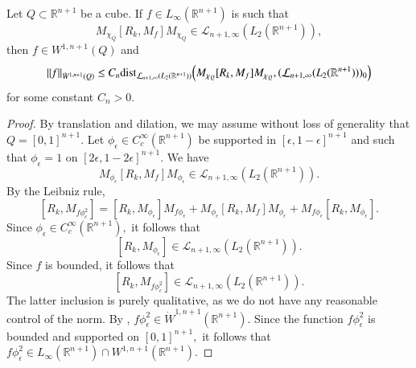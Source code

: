 \documentclass[12pt]{amsart}
\begin{document}
\begin{lemma}\label{second distance lemma} Let $Q\subset\mathbb{R}^{n+1}$ be a cube. If $f\in L_{\infty}(\mathbb{R}^{n+1})$ is such that
$$M_{\chi_Q}[R_k,M_f]M_{\chi_Q}\in\mathcal{L}_{n+1,\infty}(L_2(\mathbb{R}^{n+1})),$$
then $f\in W^{1,n+1}(Q)$ and
$$\|f\|_{\dot{W}^{1,n+1}(Q)}\leq C_n{\rm dist}_{\mathcal{L}_{n+1,\infty}(L_2(\mathbb{R}^{n+1}))}\Big(M_{\chi_Q}[R_k,M_f]M_{\chi_Q},(\mathcal{L}_{n+1,\infty}(L_2(\mathbb{R}^{n+1})))_0\Big)$$
for some constant $C_n>0$.
\end{lemma}
\begin{proof} By translation and dilation, we may assume without loss of generality that $Q=[0,1]^{n+1}.$ Let $\phi_{\epsilon}\in C^{\infty}_c(\mathbb{R}^{n+1})$ be supported in $[\epsilon,1-\epsilon]^{n+1}$ and such that $\phi_{\epsilon}=1$ on $[2\epsilon,1-2\epsilon]^{n+1}.$ We have
$$M_{\phi_{\epsilon}}[R_k,M_f]M_{\phi_{\epsilon}}\in\mathcal{L}_{n+1,\infty}(L_2(\mathbb{R}^{n+1})).$$
By the Leibniz rule,
$$[R_k,M_{f\phi_{\epsilon}^2}]=[R_k,M_{\phi_{\epsilon}}] M_{f\phi_{\epsilon}}+M_{\phi_{\epsilon}}[R_k,M_f]M_{\phi_{\epsilon}}+M_{f\phi_{\epsilon}} [R_k,M_{\phi_{\epsilon}}].$$
Since $\phi_{\epsilon}\in C^{\infty}_c(\mathbb{R}^{n+1}),$ it follows that
$$[R_k,M_{\phi_{\epsilon}}]\in\mathcal{L}_{n+1,\infty}(L_2(\mathbb{R}^{n+1})).$$
Since $f$ is bounded, it follows that
$$[R_k,M_{f\phi_{\epsilon}^2}]\in\mathcal{L}_{n+1,\infty}(L_2(\mathbb{R}^{n+1})).$$
The latter inclusion is purely {\color{blue}qualitative}, as we do not have any reasonable control of the norm. By \cite[Theorem 1]{LMSZ}, $f\phi_{\epsilon}^2\in \dot{W}^{1,n+1}(\mathbb{R}^{n+1}).$ Since the function $f\phi_{\epsilon}^2$ is bounded and supported on $[0,1]^{n+1},$ it follows that $f\phi_{\epsilon}^2\in L_{\infty}(\mathbb{R}^{n+1})\cap W^{1,n+1}(\mathbb{R}^{n+1}).$


\end{proof}
\end{document}

